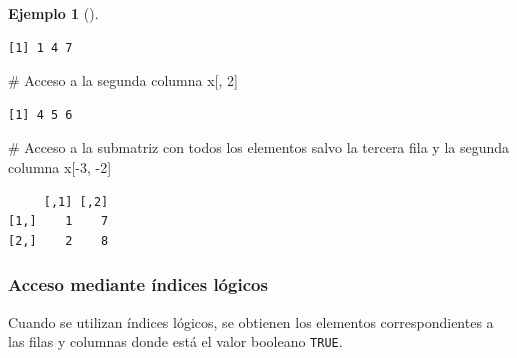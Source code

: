 \documentclass[
  a4paper,
]{scrreport}
\newenvironment{Shaded}{\begin{snugshade}}{\end{snugshade}}
\newcommand{\CommentTok}[1]{\textcolor[rgb]{0.37,0.37,0.37}{#1}}
\newcommand{\DecValTok}[1]{\textcolor[rgb]{0.68,0.00,0.00}{#1}}
\newcommand{\NormalTok}[1]{\textcolor[rgb]{0.00,0.23,0.31}{#1}}
\newcommand{\SpecialCharTok}[1]{\textcolor[rgb]{0.37,0.37,0.37}{#1}}
\theoremstyle{definition}
\newtheorem{example}{Ejemplo}[chapter]
\theoremstyle{definition}
\theoremstyle{remark}
\begin{document}
\begin{example}[]
\begin{verbatim}
[1] 1 4 7
\end{verbatim}

\begin{Shaded}
\begin{Highlighting}[]
\CommentTok{\# Acceso a la segunda columna}
\NormalTok{x[, }\DecValTok{2}\NormalTok{]}
\end{Highlighting}
\end{Shaded}

\begin{verbatim}
[1] 4 5 6
\end{verbatim}

\begin{Shaded}
\begin{Highlighting}[]
\CommentTok{\# Acceso a la submatriz con todos los elementos salvo la tercera fila y la segunda columna}
\NormalTok{x[}\SpecialCharTok{{-}}\DecValTok{3}\NormalTok{, }\SpecialCharTok{{-}}\DecValTok{2}\NormalTok{]}
\end{Highlighting}
\end{Shaded}

\begin{verbatim}
     [,1] [,2]
[1,]    1    7
[2,]    2    8
\end{verbatim}

\end{example}

\hypertarget{acceso-mediante-uxedndices-luxf3gicos}{%
\subsubsection{Acceso mediante índices
lógicos}\label{acceso-mediante-uxedndices-luxf3gicos}}

Cuando se utilizan índices lógicos, se obtienen los elementos
correspondientes a las filas y columnas donde está el valor booleano
\texttt{TRUE}.
\end{document}

